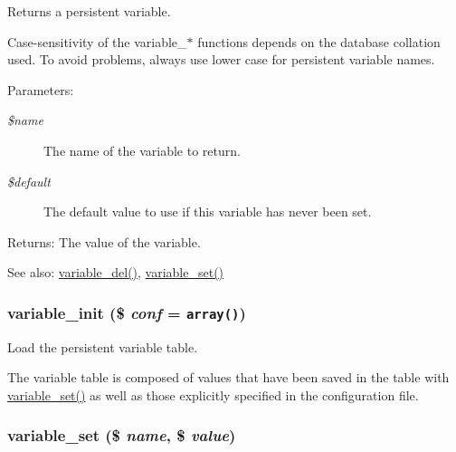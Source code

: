 Returns a persistent variable.

Case-sensitivity of the variable\_\-$\ast$ functions depends on the database collation used. To avoid problems, always use lower case for persistent variable names.

\begin{Desc}
\item[Parameters:]
\begin{description}
\item[{\em \$name}]The name of the variable to return. \item[{\em \$default}]The default value to use if this variable has never been set. \end{description}
\end{Desc}
\begin{Desc}
\item[Returns:]The value of the variable.\end{Desc}
\begin{Desc}
\item[See also:]\hyperlink{bootstrap_8inc_7850bff5f313f85335f418e6d87606b1}{variable\_\-del()}, \hyperlink{bootstrap_8inc_9859faa6fcd56ca6048be93dace95999}{variable\_\-set()} \end{Desc}
\hypertarget{bootstrap_8inc_222324598cdafc327254344a6c2d2aa2}{
\subsubsection[{variable\_\-init}]{\setlength{\rightskip}{0pt plus 5cm}variable\_\-init (\$ {\em conf} = {\tt array()})}}
\label{bootstrap_8inc_222324598cdafc327254344a6c2d2aa2}


Load the persistent variable table.

The variable table is composed of values that have been saved in the table with \hyperlink{bootstrap_8inc_9859faa6fcd56ca6048be93dace95999}{variable\_\-set()} as well as those explicitly specified in the configuration file. \hypertarget{bootstrap_8inc_9859faa6fcd56ca6048be93dace95999}{
\subsubsection[{variable\_\-set}]{\setlength{\rightskip}{0pt plus 5cm}variable\_\-set (\$ {\em name}, \/  \$ {\em value})}}
\label{bootstrap_8inc_9859faa6fcd56ca6048be93dace95999}


